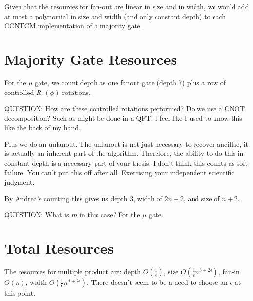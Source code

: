 \documentclass{article}
\begin{document}
Given that the resources for fan-out are linear in size and in width,
we would add at most a polynomial in size and width (and only constant
depth) to each CCNTCM implementation of a majority gate.

\section{Majority Gate Resources}

For the $\mu$ gate, we count depth as one fanout gate (depth 7) plus a
row of controlled $R_z(\phi)$ rotations.

QUESTION: How are these controlled rotations performed? Do we use a CNOT
decomposition? Such as might be done in a QFT. I feel like I used to know
this like the back of my hand.

Plus we do an unfanout. The unfanout is not just necessary to recover
ancillae, it is actually an inherent part of the algorithm. Therefore,
the ability to do this in constant-depth is a necessary part of your
thesis. I don't think this counts as soft failure.
You can't put this off after all. Exercising your independent scientific
judgment.

By Andrea's counting this gives us depth $3$, width of $2n+2$, and
size of $n+2$.

QUESTION: What is $m$ in this case? For the $\mu$ gate.

\section{Total Resources}

The resources for multiple product are: depth $O(\frac{1}{\epsilon})$,
size $O(\frac{1}{\epsilon}n^{3+2\epsilon})$, fan-in $O(n)$,
width $O(\frac{1}{\epsilon}n^{4+2\epsilon})$. There doesn't seem to be a
need to choose an $\epsilon$ at this point.
\end{document}
